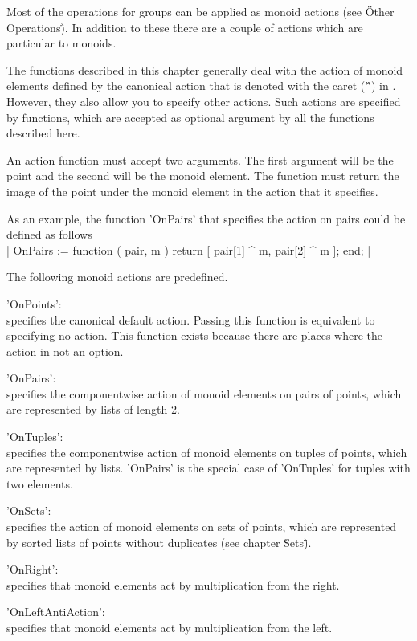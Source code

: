 Most of  the operations for groups can  be applied as monoid actions (see
\"Other Operations\").  In    addition to these there   are  a couple  of
actions which are particular to monoids.

The functions described in this chapter generally deal with the action of
monoid elements defined by the canonical action  that is denoted with the
caret ('\^') in {\GAP}.   However, they also  allow you to  specify other
actions.  Such actions are specified by functions,  which are accepted as
optional argument by all the  functions described here.

An action function must accept two arguments.  The first argument will be
the point and the  second will be the  monoid element.  The function must
return the image of the point under the monoid element in the action that
it specifies.

As an example, the function 'OnPairs'  that specifies the action on pairs
could be defined as follows\\
|    OnPairs := function ( pair, m )
        return [ pair[1] ^ m, pair[2] ^ m ];
    end; |

The following monoid actions are predefined.

'OnPoints':\\
        specifies the canonical default action.  Passing this function is
        equivalent to specifying no action.  This function exists because
        there are places where the action in not an option.

'OnPairs':\\
        specifies the componentwise action of monoid elements on pairs of
        points, which are represented by lists of length 2.

'OnTuples':\\
        specifies the componentwise  action of monoid elements on  tuples
        of  points, which  are represented  by  lists.  'OnPairs' is  the
        special case of 'OnTuples' for tuples with two elements.

'OnSets':\\
        specifies the action of monoid elements  on sets of points, which
        are represented by sorted lists of points without duplicates (see
        chapter \"Sets\").

'OnRight':\\
        specifies that  monoid  elements act by   multiplication from the
        right.

'OnLeftAntiAction':\\
        specifies  that  monoid elements act   by multiplication from the
        left.


